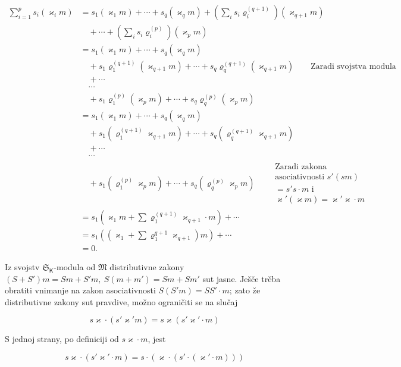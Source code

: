 \documentclass[11pt]{article}
\begin{document}
\[
\begin{aligned}
\sum_{i=1}^{p}s_i(\varkappa _i m)
&=s_1(\varkappa _1m)+\cdots+s_q(\varkappa _qm)
  +\left(\sum_i s_i\varrho_i^{(q+1)}\right)(\varkappa _{q+1}m)\\
&\quad+\cdots+\left(\sum_i s_i\varrho_i^{(p)}\right)(\varkappa _pm)\\
&=s_1(\varkappa _1m)+\cdots+s_q(\varkappa _qm)\\
&\quad+s_1\varrho_1^{(q+1)}(\varkappa _{q+1}m)+\cdots+s_q\varrho_q^{(q+1)}(\varkappa _{q+1}m)
  \qquad\text{Zaradi svojstva modula}\\
&\quad+\cdots\\
&\quad\cdots\\
&\quad+s_1\varrho_1^{(p)}(\varkappa _pm)+\cdots+s_q\varrho_q^{(p)}(\varkappa _pm)\\
&=s_1(\varkappa _1m)+\cdots+s_q(\varkappa _qm)\\
&\quad+s_1(\varrho_1^{(q+1)}\varkappa _{q+1}m)+\cdots+s_q(\varrho_q^{(q+1)}\varkappa _{q+1}m)\\
&\quad+\cdots\\
&\quad\cdots\\
&\quad+s_1(\varrho_1^{(p)}\varkappa _pm)+\cdots+s_q(\varrho_q^{(p)}\varkappa _pm)
  \qquad\begin{gathered}\text{Zaradi zakona}\\ \text{asociativnosti }s'(sm)\\ =s's\cdot m\text{ i}\\ \varkappa '(\varkappa m)=\varkappa '\varkappa \cdot m\end{gathered}\\
&=s_1\left(\varkappa _1m+\sum\varrho_1^{(q+1)}\varkappa _{q+1}\cdot m\right)+\cdots\\
&=s_1\left(\left(\varkappa _1+\sum\varrho_1^{q+1}\varkappa _{q+1}\right)m\right)+\cdots\\
&=0.
\end{aligned}
\]


Iz svojstv \(\mathfrak S_{\mathsf K}\)-modula od \(\mathfrak M\) distributivne zakony \((S+S')m=Sm+S'm,\ S(m+m')=Sm+Sm'\) sut jasne. Ješče trěba obratiti vnimanje na zakon asociativnosti \(S(S'm)=SS'\cdot m\); zato že distributivne zakony sut pravdive, možno ograničiti se na slučaj

\[
s\varkappa \cdot(s'\varkappa ' m)=s\varkappa (s'\varkappa '\cdot m)
\]

S jednoj strany, po definiciji od \(s\varkappa \cdot m\), jest

\[
s\varkappa \cdot(s'\varkappa '\cdot m)=s\cdot(\varkappa \cdot(s'\cdot(\varkappa '\cdot m)))
\]
\end{document}
